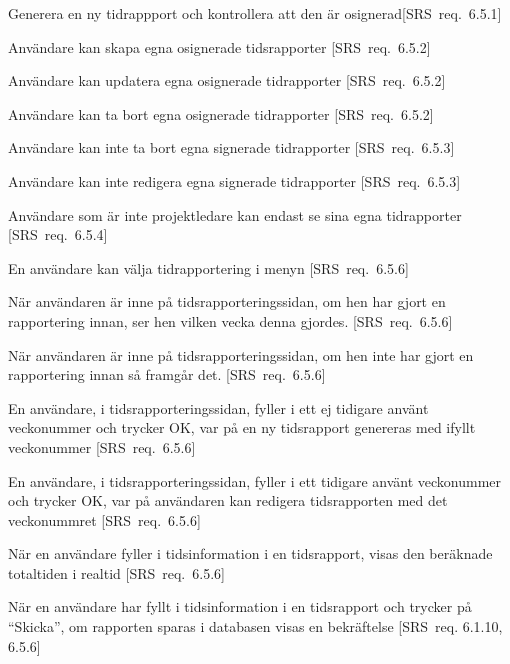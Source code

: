 \documentclass[a4paper]{article}
\begin{document}
\begin{appendices}
\begin{FT}
\item
Generera en ny tidrappport och kontrollera att den är osignerad[SRS~req.~6.5.1]

\item
Användare kan skapa egna osignerade tidsrapporter [SRS~req.~6.5.2]

\item
Användare kan updatera egna osignerade tidrapporter [SRS~req.~6.5.2]

\item
Användare kan ta bort egna osignerade tidrapporter [SRS~req.~6.5.2]

\item
Användare kan inte ta bort egna signerade tidrapporter [SRS~req.~6.5.3]

\item
Användare kan inte redigera egna signerade tidrapporter [SRS~req.~6.5.3]

\item
Användare som är inte projektledare kan endast se sina egna tidrapporter [SRS~req.~6.5.4]

\item 
En användare kan välja tidrapportering i menyn [SRS~req.~6.5.6]

\item
När användaren är inne på tidsrapporteringssidan, om hen har gjort en rapportering innan, ser hen vilken vecka denna gjordes. [SRS~req.~6.5.6]

\item
När användaren är inne på tidsrapporteringssidan, om hen inte har gjort en rapportering innan så framgår det. [SRS~req.~6.5.6]

\item
En användare, i tidsrapporteringssidan, fyller i ett ej tidigare använt veckonummer och trycker OK, var på en ny tidsrapport genereras med ifyllt veckonummer [SRS~req.~6.5.6]

\item
En användare, i tidsrapporteringssidan, fyller i ett tidigare använt veckonummer och trycker OK, var på användaren kan redigera tidsrapporten med det veckonummret [SRS~req.~6.5.6]

\item 
När en användare fyller i tidsinformation i en tidsrapport, visas den beräknade totaltiden i realtid [SRS~req.~6.5.6]

\item
När en användare har fyllt i tidsinformation i en tidsrapport och trycker på ``Skicka'', om rapporten sparas i databasen visas en bekräftelse [SRS~req. 6.1.10, 6.5.6]


\end{FT}
\end{appendices}
\end{document}
